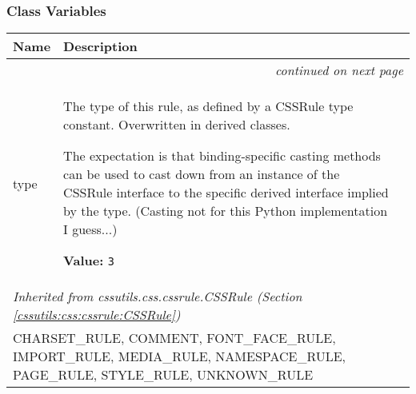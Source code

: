 
  \subsubsection{Class Variables}

    \vspace{-1cm}
\hspace{\varindent}\begin{longtable}{|p{\varnamewidth}|p{\vardescrwidth}|l}
\cline{1-2}
\cline{1-2} \centering \textbf{Name} & \centering \textbf{Description}& \\
\cline{1-2}
\endhead\cline{1-2}\multicolumn{3}{r}{\small\textit{continued on next page}}\\\endfoot\cline{1-2}
\endlastfoot\raggedright t\-y\-p\-e\- & \raggedright The type of this rule, as defined by a CSSRule type constant.
Overwritten in derived classes.

The expectation is that binding-specific casting methods can be used to
cast down from an instance of the CSSRule interface to the specific
derived interface implied by the type.
(Casting not for this Python implementation I guess...)

\textbf{Value:} 
{\tt 3}&\\
\cline{1-2}
\multicolumn{2}{|l|}{\textit{Inherited from cssutils.css.cssrule.CSSRule \textit{(Section \ref{cssutils:css:cssrule:CSSRule})}}}\\
\multicolumn{2}{|p{\varwidth}|}{\raggedright CHARSET\_RULE, COMMENT, FONT\_FACE\_RULE, IMPORT\_RULE, MEDIA\_RULE, NAMESPACE\_RULE, PAGE\_RULE, STYLE\_RULE, UNKNOWN\_RULE}\\
\cline{1-2}
\end{longtable}


